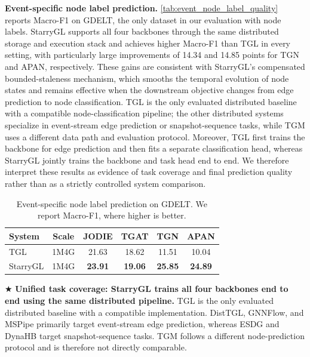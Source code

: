 \noindent\textbf{Event-specific node label prediction.} \autoref{tab:event_node_label_quality} 
reports Macro-F1 on GDELT,
the only dataset in our evaluation with node labels. StarryGL supports
all four backbones through the same distributed storage and execution
stack and achieves higher Macro-F1 than TGL in every setting, with
particularly large improvements of 14.34 and 14.85 points for TGN and
APAN, respectively. These gains are consistent with StarryGL's
compensated bounded-staleness mechanism, which smooths the temporal
evolution of node states and remains effective when the downstream
objective changes from edge prediction to node classification.
TGL is the only evaluated distributed baseline with a compatible
node-classification pipeline; the other distributed systems specialize
in event-stream edge prediction or snapshot-sequence tasks, while TGM
uses a different data path and evaluation protocol. Moreover, TGL
first trains the backbone for edge prediction and then fits a separate
classification head, whereas StarryGL jointly trains the backbone and
task head end to end. We therefore interpret these results as evidence
of task coverage and final prediction quality rather than as a strictly
controlled system comparison.
\begin{table}[htbp]
\centering
\caption{Event-specific node label prediction on GDELT. We report Macro-F1, where higher is better.}
\vspace{-10pt}
\label{tab:event_node_label_quality}
\small
\begin{tabular}{lccccc}
\toprule
System & Scale &JODIE & TGAT & TGN & APAN \\
\midrule
TGL &1M4G & 21.63 & 18.62 & 11.51 & 10.04 \\
StarryGL&1M4G& \textbf{23.91} & \textbf{19.06} & \textbf{25.85} & \textbf{24.89} \\
\bottomrule
\end{tabular}
\begin{minipage}{\linewidth}
\scriptsize
$\bigstar$
\textbf{Unified task coverage: StarryGL trains all four backbones
end to end using the same distributed pipeline.} TGL is the only evaluated distributed baseline with a compatible
implementation. DistTGL, GNNFlow, and MSPipe primarily target
event-stream edge prediction, whereas ESDG and DynaHB target
snapshot-sequence tasks. TGM follows a different node-prediction
protocol and is therefore not directly comparable.
\end{minipage}
\vspace{-25pt}
\end{table}

